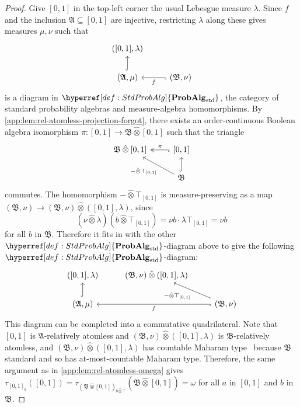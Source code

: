 \documentclass[
  sigconf,
  screen, ]{acmart}
\theoremstyle{definition}
\newcommand\frakA{\mathfrak A}
\newcommand\frakB{\mathfrak B}
\newcommand\fremlinf[3]{\cite[\href{https://www1.essex.ac.uk/maths/people/fremlin/chap#2.pdf\#page=#3}{#1}]{fremlin2000measure}}
\newcommand\nref[2]{\hyperref[#1]{#2}} \newcommand\checkhigh{{\huge{\color{red}\textbf{TODO: check}}}}
\newcommand\lmafp{\mathbin{\hat\otimes}}
\newcommand\StdProbAlg{\nref{def:StdProbAlg}{\mathbf{ProbAlg}_{\rm std}}}
\begin{document}
\begin{proof}
  Give $[0,1]$ in the top-left corner the usual Lebesgue measure $\lambda$.
  Since $f$ and the inclusion $\frakA\subseteq [0,1]$ are injective,
  restricting $\lambda$ along these gives measures $\mu,\nu$ such that
   \[ \begin{tikzcd}
    {([0,1],\lambda)}                        &  \\
    {(\frakA,\mu)} \arrow[u, hook] & {(\frakB,\nu)} \arrow[l, "f", hook] 
    \end{tikzcd}\]
  is a diagram in $\StdProbAlg$,
  the category of standard probability algebras and measure-algebra homomorphisms.
  By \cref{app:lem:rel-atomless-projection-forgot},
  there exists an order-continuous Boolean algebra isomorphism $\pi : [0,1]\to \frakB\lmafp[0,1]$
  such that the triangle
  \[
\begin{tikzcd}
  {\frakB\lmafp[0,1]} & {[0,1]} \arrow[l, "\pi"', two heads, hook]                 \\
                      & \frakB \arrow[u, hook] \arrow[lu, "{-\lmafp\top_{[0,1]}}"]
  \end{tikzcd}
  \]
  commutes.
  The homomorphism $-\lmafp \top_{[0,1]}$
  is measure-preserving as a map $(\frakB,\nu)\to (\frakB,\nu)\lmafp([0,1], \lambda)$,
  since
  \[ 
    (\nu\lmafp\lambda)(b\lmafp\top_{[0,1]})
    = \nu b\cdot \lambda\top_{[0,1]}
    = \nu b
    \]
  for all $b$ in $\frakB$.
  Therefore it fits in with the other $\StdProbAlg$-diagram above to give the following
  $\StdProbAlg$-diagram:
   \[ 
\begin{tikzcd}
  {([0,1],\lambda)}              & {(\frakB,\nu)\lmafp([0,1],\lambda)} &                                                                           \\
  {(\frakA,\mu)} \arrow[u, hook] &                     & {(\frakB,\nu)} \arrow[ll, "f", hook] \arrow[lu, "{-\lmafp \top_{[0,1]}}"]
  \end{tikzcd}
    \]
  This diagram can be completed into a commutative quadrilateral.
  Note that
  $[0,1]$ is $\frakA$-relatively atomless
  and $(\frakB,\nu)\lmafp([0,1],\lambda)$
  is $\frakB$-relatively atomless,
  and $(\frakB,\nu)\lmafp([0,1],\lambda)$
  has countable Maharam type~\fremlinf{333G(a)}{33}{26}
  because $\frakB$ standard and so has at-most-countable Maharam type.
  Therefore, the same argument as in \cref{app:lem:rel-atomless-omega}
  gives $\tau_{[0,1]_a}([0,1]) = \tau_{(\frakB\lmafp[0,1])_{b\lmafp \top}}(\frakB\lmafp[0,1]) =\omega$
  for all $a$ in $[0,1]$ and $b$ in $\frakB$.

\end{proof}
\end{document}
